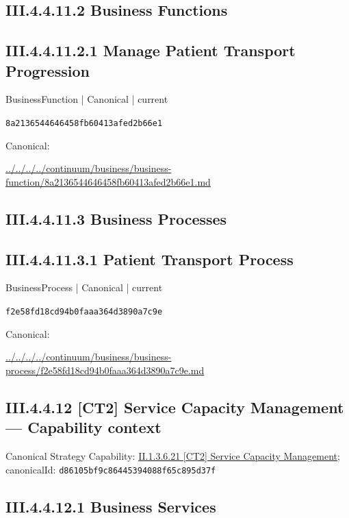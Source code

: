 \documentclass[10pt,a4paper]{article}
\begin{document}
\subsection*{III.4.4.11.2 Business Functions}
\subsection*{III.4.4.11.2.1 Manage Patient Transport Progression}
\label{element-8a2136544646458fb60413afed2b66e1}
{\small BusinessFunction | Canonical | current}\par
\texttt{8a2136544646458fb60413afed2b66e1}\par
Canonical: \par
{\footnotesize\url{../../../../continuum/business/business-function/8a2136544646458fb60413afed2b66e1.md}}\par
\subsection*{III.4.4.11.3 Business Processes}
\subsection*{III.4.4.11.3.1 Patient Transport Process}
\label{element-f2e58fd18cd94b0faaa364d3890a7c9e}
{\small BusinessProcess | Canonical | current}\par
\texttt{f2e58fd18cd94b0faaa364d3890a7c9e}\par
Canonical: \par
{\footnotesize\url{../../../../continuum/business/business-process/f2e58fd18cd94b0faaa364d3890a7c9e.md}}\par
\subsection*{III.4.4.12 [CT2] Service Capacity Management — Capability context}
Canonical Strategy Capability: \hyperref[element-d86105bf9c86445394088f65c895d37f]{II.1.3.6.21 [CT2] Service Capacity Management}; canonicalId: \texttt{d86105bf9c86445394088f65c895d37f}\par
\subsection*{III.4.4.12.1 Business Services}
\end{document}
